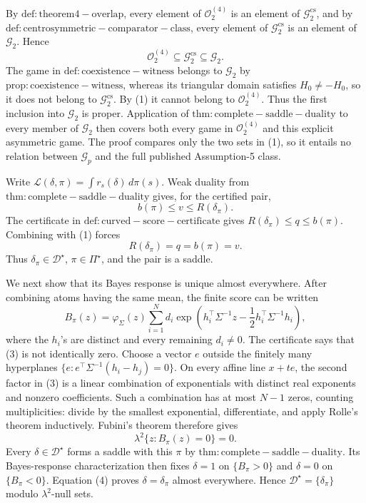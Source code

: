 By \(\mathrm{def:theorem4-overlap}\), every element of \(\mathcal O_2^{(4)}\) is an element of \(\mathcal G_2^{\mathrm{cs}}\), and by \(\mathrm{def:centrosymmetric-comparator-class}\), every element of \(\mathcal G_2^{\mathrm{cs}}\) is an element of \(\mathcal G_2\). Hence
\[
 \mathcal O_2^{(4)}\subseteq\mathcal G_2^{\mathrm{cs}}\subseteq\mathcal G_2. \tag{1}
\]
The game in \(\mathrm{def:coexistence-witness}\) belongs to \(\mathcal G_2\) by \(\mathrm{prop:coexistence-witness}\), whereas its triangular domain satisfies \(H_0\neq-H_0\), so it does not belong to \(\mathcal G_2^{\mathrm{cs}}\). By (1) it cannot belong to \(\mathcal O_2^{(4)}\). Thus the first inclusion into \(\mathcal G_2\) is proper. Application of \(\mathrm{thm:complete-saddle-duality}\) to every member of \(\mathcal G_2\) then covers both every game in \(\mathcal O_2^{(4)}\) and this explicit asymmetric game. The proof compares only the two sets in (1), so it entails no relation between \(\mathcal G_p\) and the full published Assumption-5 class.

Write \(\mathcal L(\delta,\pi)=\int r_s(\delta)\,d\pi(s)\). Weak duality from \(\mathrm{thm:complete-saddle-duality}\) gives, for the certified pair,
\[
 b(\pi)\leq v\leq R(\delta_{\pi}). \tag{1}
\]
The certificate in \(\mathrm{def:curved-score-certificate}\) gives
\(R(\delta_{\pi})\leq q\leq b(\pi)\). Combining with (1) forces
\[
 R(\delta_{\pi})=q=b(\pi)=v. \tag{2}
\]
Thus \(\delta_{\pi}\in\mathcal D^{\star}\), \(\pi\in\Pi^{\star}\), and the pair is a saddle.

We next show that its Bayes response is unique almost everywhere. After combining atoms having the same mean, the finite score can be written
\[
 B_{\pi}(z)=\varphi_{\Sigma}(z)
 \sum_{i=1}^N d_i
 \exp\!\left(h_i^{\top}\Sigma^{-1}z-\frac12h_i^{\top}\Sigma^{-1}h_i\right), \tag{3}
\]
where the \(h_i\)'s are distinct and every remaining \(d_i\neq0\). The certificate says that (3) is not identically zero. Choose a vector \(e\) outside the finitely many hyperplanes
\(\{e:e^{\top}\Sigma^{-1}(h_i-h_j)=0\}\). On every affine line \(x+te\), the second factor in (3) is a linear combination of exponentials with distinct real exponents and nonzero coefficients. Such a combination has at most \(N-1\) zeros, counting multiplicities: divide by the smallest exponential, differentiate, and apply Rolle's theorem inductively. Fubini's theorem therefore gives
\[
 \lambda^2\{z:B_{\pi}(z)=0\}=0. \tag{4}
\]
Every \(\delta\in\mathcal D^{\star}\) forms a saddle with this \(\pi\) by \(\mathrm{thm:complete-saddle-duality}\). Its Bayes-response characterization then fixes \(\delta=1\) on \(\{B_{\pi}>0\}\) and \(\delta=0\) on \(\{B_{\pi}<0\}\). Equation (4) proves \(\delta=\delta_{\pi}\) almost everywhere. Hence \(\mathcal D^{\star}=\{\delta_{\pi}\}\) modulo \(\lambda^2\)-null sets.

